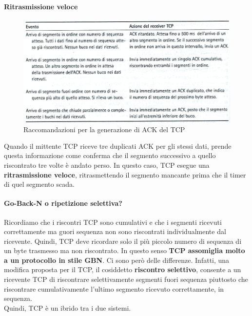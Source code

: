 \documentclass[11pt,a4paper]{book}
\begin{document}
\paragraph{Ritrasmissione veloce}
\begin{figure}
	\includegraphics[scale=0.6]{img/034.png}
	\caption{Raccomandazioni per la generazione di ACK del TCP}
\end{figure}
Quando il mittente TCP riceve tre duplicati ACK per gli stessi dati, prende questa informazione come conferma che il segmento successivo a quello riscontrato tre volte è andato perso. In questo caso, TCP esegue una \textbf{ritrasmissione veloce}, ritrasmettendo il segmento mancante prima che il timer di quel segmento scada.
\paragraph{Go-Back-N o ripetizione selettiva?}
Ricordiamo che i riscontri TCP sono cumulativi e che i segmenti ricevuti correttamente ma guori sequenza non sono riscontrati individualmente dal ricevente. Quindi, TCP deve ricordare solo il più piccolo numero di sequenza di un byte trasmesso ma non riscontrato. In questo senso \textbf{TCP assomiglia molto a un protocollo in stile GBN}. Ci sono però delle differenze. Infatti, una modifica proposta per il TCP, il cosiddetto \textbf{riscontro selettivo}, consente a un ricevente TCP di riscontrare selettivamente segmenti fuori sequenza piuttosto che riscontrare cumulativamente l'ultimo segmento ricevuto correttamente, in sequenza. \\
Quindi, TCP è un ibrido tra i due sistemi.
\end{document}
